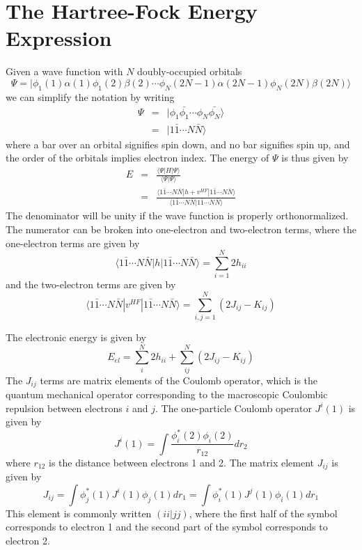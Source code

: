 \section{The Hartree-Fock Energy Expression}
Given a wave function with $N$ doubly-occupied
orbitals
\begin{equation}
  \Psi = |\phi_1(1)\alpha(1)\phi_1(2)\beta(2)\cdots
	\phi_N(2N-1)\alpha(2N-1)\phi_N(2N)\beta(2N)\rangle
\label{eq:prodwf}
\end{equation}
we can simplify the notation by writing
\begin{eqnarray}
  \Psi &=& |\phi_1\bar{\phi_1}\cdots\phi_N\bar{\phi_N}\rangle \\
   &=& |1\bar{1}\cdots N\bar{N}\rangle
\end{eqnarray}
where a bar over an orbital signifies spin down, and no bar signifies
spin up, and the order of the orbitals implies electron index. The
energy of $\Psi$ is thus given by  
\begin{eqnarray}
  E &=&  \frac {\langle\Psi|H|\Psi\rangle}{\langle\Psi|\Psi\rangle} \\
    &=&  \frac {\langle 1\bar{1}\cdots N\bar{N}|h + v^{HF}|
	1\bar{1}\cdots N\bar{N} \rangle}
	{\langle 1\bar{1}\cdots N\bar{N}|1\bar{1}\cdots N\bar{N}\rangle}
\end{eqnarray}
The denominator will be unity if the wave function is
properly orthonormalized. The numerator can be broken into
one-electron and two-electron terms, where the one-electron terms are
given by
\begin{equation}
  \langle 1\bar{1}\cdots N\bar{N}|h|1\bar{1}\cdots N\bar{N} \rangle
	= \sum_{i=1}^N 2h_{ii}
\end{equation}
and the two-electron terms are given by
\begin{equation}
  \langle 1\bar{1}\cdots N\bar{N}|v^{HF}|1\bar{1}\cdots N\bar{N} \rangle
	= \sum_{i,j=1}^N (2J_{ij}-K_{ij})
\end{equation}

The electronic energy is given by
\begin{equation}
  E_{el} = \sum_i^N 2h_{ii} + \sum_{ij}^N(2J_{ij}-K_{ij})
\label{eq:eel}
\end{equation}
The $J_{ij}$ terms are matrix elements of the Coulomb
operator, which is the quantum mechanical operator corresponding to
the macroscopic Coulombic repulsion between electrons $i$ and $j$. The
one-particle Coulomb operator $J^i(1)$ is given by
\begin{equation}
  J^i(1) = \int\frac{\phi_i^*(2)\phi_i(2)}{r_{12}}dr_2
\label{eq:jone}
\end{equation}
where $r_{12}$ is the distance between electrons 1 and
2. The matrix element $J_{ij}$ is given by
\begin{equation}
  J_{ij} = \int\phi_j^*(1)J^i(1)\phi_j(1)dr_1 
	= \int\phi_i^*(1)J^j(1)\phi_i(1)dr_1 
\end{equation}
This element is commonly written $(ii|jj)$, where the first
half of the symbol corresponds to electron 1 and the second part of
the symbol corresponds to electron 2.


